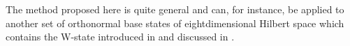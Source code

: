 The method proposed here is quite general and can, for instance, be applied to
another set of orthonormal base states of eightdimensional Hilbert space which contains the
W-state introduced in \cite{zeil-97} and discussed in \cite{dvc-2000}.
%
%
